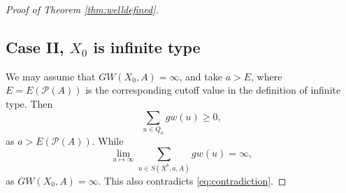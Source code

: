 \documentclass{amsart}
\numberwithin{equation}{section}
\theoremstyle{definition}
\theoremstyle{remark}
\DeclareMathOperator {\mult} {mult}
\begin{document}
\begin{proof} [Proof of Theorem \ref{thm:welldefined}]
\subsection {Case II, $X _{0} $ is infinite type} We may assume that $GW (X _{0},
A) =
\infty$, and take $a > E$, where $E=E (\mathcal{P} (A) )$ is the corresponding cutoff
value in the definition of infinite type.
Then 
\begin{equation*}
\sum _{u  \in Q _{a} } gw (u) \geq 0,
\end {equation*}
as $a > E (\mathcal{P} (A))$.
While 
\begin {equation*}
\lim _{a \mapsto \infty}  \sum _{u \in 
S (X ^{b}, a, A)} gw (u) = \infty,
\end{equation*}
as $GW (X _{0}, A) = \infty$.
This also contradicts \eqref{eq:contradiction}. 
%
%
\end{proof}
\end{document}

